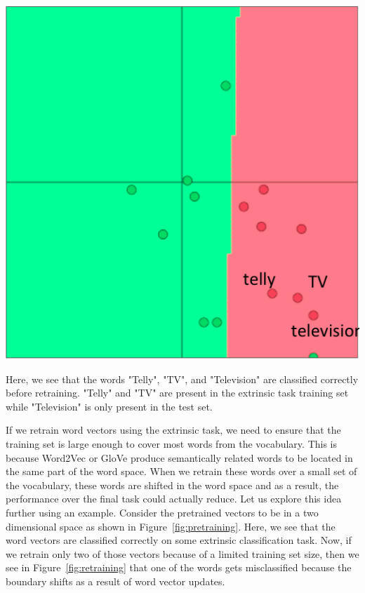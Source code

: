 \documentclass{tufte-handout}
\begin{document}
\begin{marginfigure}%
  \includegraphics[width = \linewidth]{pretraining}
  \caption{Here, we see that the words "Telly", "TV", and "Television" are classified correctly before retraining. "Telly" and "TV" are present in the extrinsic task training set while "Television" is only present in the test set.}
    \label{fig:pretraining}
\end{marginfigure}

If we retrain word vectors using the extrinsic task, we need to ensure that the training set is large enough to cover most words from the vocabulary. This is because Word2Vec or GloVe produce semantically related words to be located in the same part of the word space. When we retrain these words over a small set of the vocabulary, these words are shifted in the word space and as a result, the performance over the final task could actually reduce. Let us explore this idea further using an example. Consider the pretrained vectors to be in a two dimensional space as shown in Figure~\ref{fig:pretraining}.  Here, we see that the word vectors are classified correctly on some extrinsic classification task. Now, if we retrain only two of those vectors because of a limited training set size, then we see in Figure~\ref{fig:retraining} that one of the words gets misclassified because the boundary shifts as a result of word vector updates.
\end{document}
